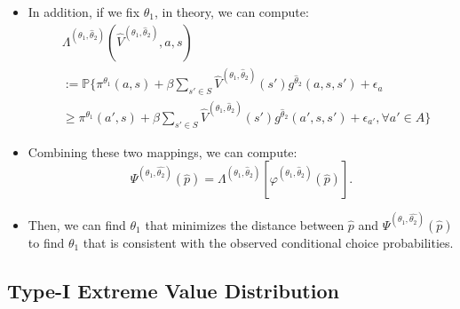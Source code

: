 \documentclass[
]{book}
\providecommand{\tightlist}{%
  \setlength{\itemsep}{0pt}\setlength{\parskip}{0pt}}
\begin{document}
\begin{itemize}
\tightlist
\item
  In addition, if we fix \(\theta_1\), in theory, we can compute:
  \begin{equation}
  \begin{split}
  &\Lambda^{(\theta_1, \hat{\theta}_2)}(\hat{V}^{(\theta_1, \hat{\theta}_2)}, a, s)\\
  &:= \mathbb{P}\Bigg\{\pi^{\theta_1}(a , s) + \beta \sum_{s' \in S} \hat{V}^{(\theta_1, \hat{\theta}_2)}(s') g^{\hat{\theta}_2}(a, s, s') + \epsilon_a\\
  &\ge \pi^{\theta_1}(a' , s) + \beta \sum_{s' \in S} \hat{V}^{(\theta_1, \hat{\theta}_2)}(s') g^{\hat{\theta}_2}(a', s, s') + \epsilon_{a'}, \forall a' \in A \Bigg\}
  \end{split}
  \end{equation}
\item
  Combining these two mappings, we can compute:
  \begin{equation}
  \Psi^{(\theta_1, \hat{\theta_2})}(\hat{p}) = \Lambda^{(\theta_1, \hat{\theta}_2)}[\varphi^{(\theta_1, \hat{\theta}_2)}(\hat{p})].
  \end{equation}
\item
  Then, we can find \(\theta_1\) that minimizes the distance between \(\hat{p}\) and \(\Psi^{(\theta_1, \hat{\theta_2})}(\hat{p})\) to find \(\theta_1\) that is consistent with the observed conditional choice probabilities.
\end{itemize}

\hypertarget{type-i-extreme-value-distribution}{%
\subsection{Type-I Extreme Value Distribution}\label{type-i-extreme-value-distribution}}
\end{document}
